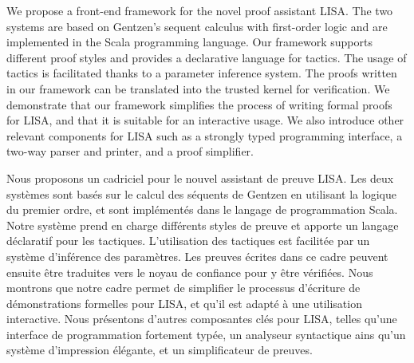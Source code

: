 \newenvironment{abstractpage}
  {\cleardoublepage\vspace*{\fill}\thispagestyle{empty}}
  {\vfill\cleardoublepage}
\newenvironment{i18nabstract}[1]
  {\bigskip\selectlanguage{#1}%
   \begin{center}\bfseries\abstractname\end{center}}
  {\par\bigskip}

\begin{abstractpage}
\begin{i18nabstract}{english}
  We propose a front-end framework for the novel proof assistant LISA. The two systems are based on Gentzen's sequent calculus with first-order logic and are implemented in the Scala programming language. Our framework supports different proof styles and provides a declarative language for tactics. The usage of tactics is facilitated thanks to a parameter inference system. The proofs written in our framework can be translated into the trusted kernel for verification. We demonstrate that our framework simplifies the process of writing formal proofs for LISA, and that it is suitable for an interactive usage. We also introduce other relevant components for LISA such as a strongly typed programming interface, a two-way parser and printer, and a proof simplifier.
\end{i18nabstract}

\begin{i18nabstract}{french}
  Nous proposons un cadriciel pour le nouvel assistant de preuve LISA. Les deux systèmes sont basés sur le calcul des séquents de Gentzen en utilisant la logique du premier ordre, et sont implémentés dans le langage de programmation Scala. Notre système prend en charge différents styles de preuve et apporte un langage déclaratif pour les tactiques. L'utilisation des tactiques est facilitée par un système d'inférence des paramètres. Les preuves écrites dans ce cadre peuvent ensuite être traduites vers le noyau de confiance pour y être vérifiées. Nous montrons que notre cadre permet de simplifier le processus d'écriture de démonstrations formelles pour LISA, et qu'il est adapté à une utilisation interactive. Nous présentons d'autres composantes clés pour LISA, telles qu'une interface de programmation fortement typée, un analyseur syntactique ains qu'un système d'impression élégante, et un simplificateur de preuves.
\end{i18nabstract}
\end{abstractpage}

